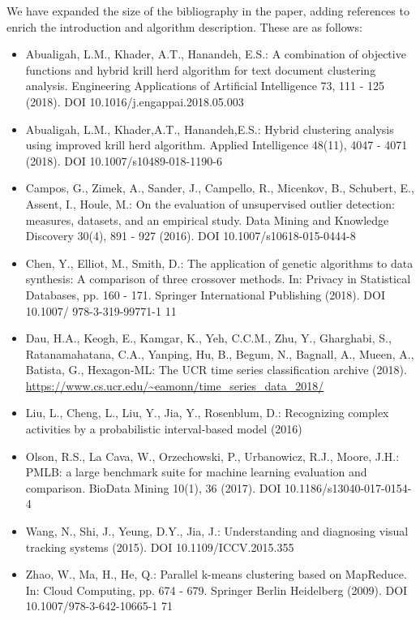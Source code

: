 \documentclass[11pt]{article}
\begin{document}
We have expanded the size of the bibliography in the paper, adding references to
enrich the introduction and algorithm description. These are as follows:
\begin{itemize}
    \item Abualigah, L.M., Khader, A.T., Hanandeh, E.S.: A combination of
        objective functions and hybrid krill herd algorithm for text document
        clustering analysis. Engineering Applications of Artificial Intelligence
        73, 111 \-- 125 (2018). DOI 10.1016/j.engappai.2018.05.003
    \item Abualigah, L.M., Khader,A.T., Hanandeh,E.S.: Hybrid clustering
        analysis using improved krill herd algorithm. Applied Intelligence
        48(11), 4047 \-- 4071 (2018). DOI 10.1007/s10489-018-1190-6
    \item Campos, G., Zimek, A., Sander, J., Campello, R., Micenkov, B.,
        Schubert, E., Assent, I., Houle, M.: On the evaluation of unsupervised
        outlier detection: measures, datasets, and an empirical study. Data
        Mining and Knowledge Discovery 30(4), 891 \-- 927 (2016). DOI
        10.1007/s10618-015-0444-8
    \item Chen, Y., Elliot, M., Smith, D.: The application of genetic algorithms
        to data synthesis: A comparison of three crossover methods. In: Privacy
        in Statistical Databases, pp. 160 \-- 171. Springer International
        Publishing (2018). DOI 10.1007/ 978-3-319-99771-1 11
    \item Dau, H.A., Keogh, E., Kamgar, K., Yeh, C.C.M., Zhu, Y., Gharghabi, S.,
        Ratanamahatana, C.A., Yanping, Hu, B., Begum, N., Bagnall, A., Mueen,
        A., Batista, G., Hexagon-ML: The UCR time series classification archive
        (2018). \url{https://www.cs.ucr.edu/~eamonn/time_series_data_2018/}
    \item Liu, L., Cheng, L., Liu, Y., Jia, Y., Rosenblum, D.: Recognizing
        complex activities by a probabilistic interval-based model (2016)
    \item Olson, R.S., La Cava, W., Orzechowski, P., Urbanowicz, R.J., Moore,
        J.H.: PMLB: a large benchmark suite for machine learning evaluation and
        comparison. BioData Mining 10(1), 36 (2017). DOI
        10.1186/s13040-017-0154-4
    \item Wang, N., Shi, J., Yeung, D.Y., Jia, J.: Understanding and diagnosing
        visual tracking systems (2015). DOI 10.1109/ICCV.2015.355
    \item Zhao, W., Ma, H., He, Q.: Parallel k-means clustering based on
        MapReduce. In: Cloud Computing, pp. 674 \-- 679. Springer Berlin
        Heidelberg (2009). DOI 10.1007/978-3-642-10665-1 71
\end{itemize}
\end{document}
